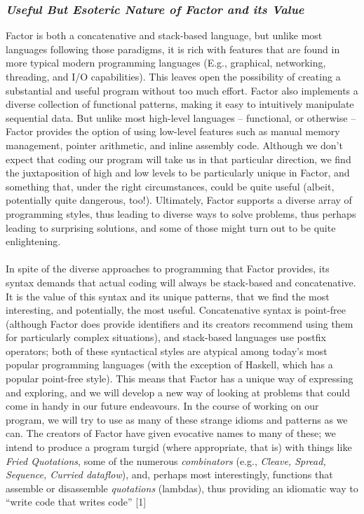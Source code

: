 \documentclass{sig-alternate}
\begin{document}
\subsubsection*{\textit{Useful But Esoteric Nature of Factor and its Value}}
Factor is both a concatenative and stack-based language, but
unlike most languages following those paradigms, it is rich with
features that are found in more typical modern programming languages
(E.g., graphical, networking, threading, and I/O capabilities). This
leaves open the possibility of creating a substantial and useful
program without too much effort. Factor also implements a diverse
collection of functional patterns, making it easy to intuitively
manipulate sequential data. But unlike most high-level languages --
functional, or otherwise -- Factor provides the option of using low-level
 features such as manual memory management, pointer arithmetic,
and inline assembly code. Although we don't expect that coding our
program will take us in that particular direction, we find the
juxtaposition of high and low levels to be particularly unique in
Factor, and something that, under the right circumstances, could be
quite useful (albeit, potentially quite dangerous, too!). Ultimately,
Factor supports a diverse array of programming styles, thus leading to
diverse ways to solve problems, thus perhaps leading to surprising
solutions, and some of those might turn out to be quite enlightening.\\\\
In spite of the diverse approaches to programming that Factor
provides, its syntax demands that actual coding will always be stack-based
 and concatenative. It is the value of this syntax and its unique
patterns, that we find the most interesting, and potentially, the most
useful. Concatenative syntax is point-free (although Factor does
provide identifiers and its creators recommend using them for
particularly complex situations), and stack-based languages use
postfix operators; both of these syntactical styles are atypical among
today's most popular programming languages (with the exception of
Haskell, which has a popular point-free style). This means that Factor
has a unique way of expressing and exploring, and we will develop a
new way of looking at problems that could come in handy in our future
endeavours. In the course of working on our program, we will try to
use as many of these strange idioms and patterns as we can. The
creators of Factor have given evocative names to many of these; we
intend to produce a program turgid (where appropriate, that is) with
things like  \textit{Fried Quotations}, some of the numerous
\textit{combinators} (e.g., \textit{Cleave, Spread, Sequence, Curried
dataflow}), and, perhaps most interestingly, functions that assemble
or disassemble \textit{quotations} (lambdas), thus providing an
idiomatic way to ``write code that writes code'' [1]
\end{document}
